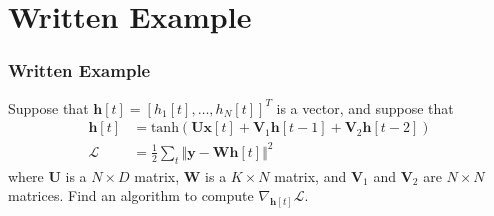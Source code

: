 \documentclass{beamer}
\begin{document}
\section[Example]{Written Example}
\setcounter{subsection}{1}

\begin{frame}
  \frametitle{Written Example}
  Suppose that $\bm{h}[t]=[h_1[t],\ldots,h_N[t]]^T$ is a vector, and suppose that
  \begin{align*}
    \bm{h}[t] &= \mbox{tanh}\left(\bm{U}\bm{x}[t] + \bm{V}_1\bm{h}[t-1]+\bm{V}_2\bm{h}[t-2]\right)\\
        {\mathcal L} &= \frac{1}{2}\sum_t \Vert\bm{y}-\bm{W}\bm{h}[t]\Vert^2
  \end{align*}
  where $\bm{U}$ is a $N\times D$ matrix, $\bm{W}$ is a $K\times N$ matrix, and
  $\bm{V}_1$ and $\bm{V}_2$ are $N\times N$ matrices.  Find an algorithm to
  compute $\nabla_{\bm{h}[t]}{\mathcal L}$.
\end{frame}
\end{document}
